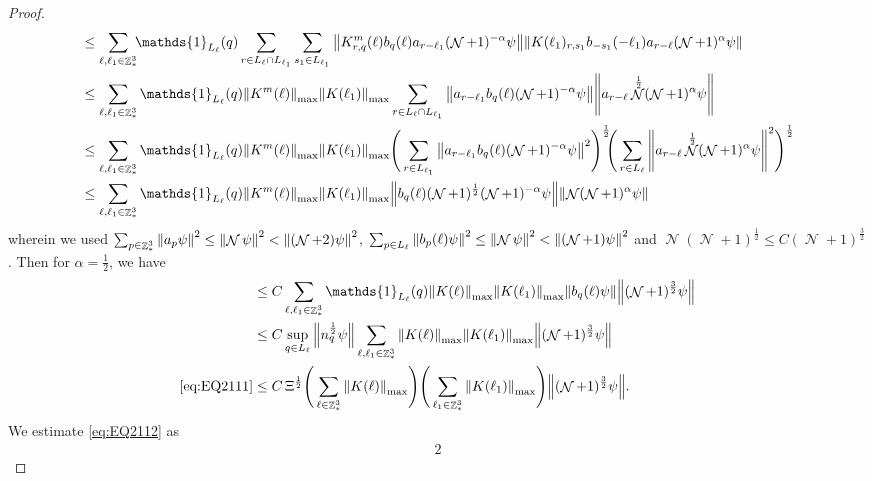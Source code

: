\documentclass[sn-mathphys, Numbered ,a4paper]{sn-jnl}%
\DeclareMathOperator{\Z}{\mathbb{Z}}
\DeclareMathOperator{\NN}{\mathcal{N}}
\newcommand{\half}{\frac{1}{2}}
\theoremstyle{plain}
\theoremstyle{definition}
\theoremstyle{remark}
\theoremstyle{plain}
\theoremstyle{definition}
\theoremstyle{remark}
\begin{document}
\begin{proof}
\begin{align}
  	&\leq \sum\limits_{\ell,\ell_1 \in \Z^3_*} \!\!\mathds{1}_{L_\ell}(q) \sum\limits_{r \in L_\ell \cap L_{\ell_1}}  \sum\limits_{s_1 \in L_{\ell_1}} \norm{ K^{m}_{r,q}(\ell) b_{q}(\ell) a_{r-\ell_1} (\NN+1)^{-\alpha}\psi}\norm{K(\ell_1)_{r,s_1} b_{-s_1}(-\ell_1)  a_{r-\ell} (\NN+1)^{\alpha}\psi } \nonumber\\
  	&\leq \sum\limits_{\ell,\ell_1 \in \Z^3_*} \mathds{1}_{L_\ell}(q) \norm{K^{m}(\ell)}_{\mathrm{max}}\norm{K(\ell_1)}_{\mathrm{max}} \sum\limits_{r \in L_\ell \cap L_{\ell_1}} \norm{ a_{r-\ell_1} b_{q}(\ell) (\NN+1)^{-\alpha} \psi} \norm { a_{r-\ell}\NN^\half (\NN+1)^{\alpha} \psi }\nonumber\\
  	&\leq \sum\limits_{\ell,\ell_1 \in \Z^3_*} \mathds{1}_{L_\ell}(q) \norm{K^{m}(\ell)}_{\mathrm{max}}\norm{K(\ell_1)}_{\mathrm{max}} \Bigg(\sum\limits_{r \in L_{\ell_1}} \norm{ a_{r-\ell_1}b_{q}(\ell) (\NN+1)^{-\alpha} \psi}^2\Bigg)^\half\!\!\Bigg( \sum\limits_{r \in L_\ell} \norm { a_{r-\ell} \NN^\half (\NN+1)^{\alpha} \psi }^2\Bigg)^\half\nonumber\\
  	&\leq \sum\limits_{\ell,\ell_1 \in \Z^3_*} \mathds{1}_{L_\ell}(q) \norm{K^{m}(\ell)}_{\mathrm{max}}\norm{K(\ell_1)}_{\mathrm{max}}  \norm{ b_{q}(\ell) (\NN+1)^\half (\NN+1)^{-\alpha} \psi}  \norm { \NN (\NN+1)^{\alpha} \psi }\nonumber
  \end{align}
  wherein we used $\sum_{p\in \Z^3_*}\norm{a_p \psi}^2\leq\norm{\NN\psi}^2<\norm{(\NN+2)\psi}^2$, $\sum_{p\in L_{\ell}}\norm{b_p({\ell}) \psi}^2\leq\norm{\NN\psi}^2<\norm{(\NN+1)\psi}^2$ and $\NN(\NN+1)^\half\leq C(\NN+1)^{\frac{3}{2}}$. Then for $\alpha = \half $, we have
  \begin{align}
  	&\leq C\sum\limits_{\ell,\ell_1 \in \Z^3_*} \mathds{1}_{L_\ell}(q) \norm{K(\ell)}_{\mathrm{max}}\norm{K(\ell_1)}_{\mathrm{max}}  \norm{b_{q}(\ell) \psi} \norm { (\NN+1)^{\frac{3}{2}} \psi } \nonumber\\
  	&\leq C \sup\limits_{q \in L_\ell} \norm{n_{q}^{\half} \psi} \sum\limits_{\ell,\ell_1 \in \Z^3_*} \norm{K(\ell)}_{\mathrm{max}} \norm{K(\ell_1)}_{\mathrm{max}} \norm { (\NN+1)^{\frac{3}{2}} \psi} \nonumber\\
  	\eqref{eq:EQ2111}&\leq C\, \Xi^\half \Bigg(\sum\limits_{\ell \in \Z^3_*} \norm{K(\ell)}_{\mathrm{max}}\Bigg)\Bigg( \sum\limits_{\ell_1 \in \Z^3_*}\norm{K(\ell_1)}_{\mathrm{max}} \Bigg)  \norm { (\NN+1)^{\frac{3}{2}} \psi }. \label{eq:estEQ2111}    
  \end{align}
  We estimate \eqref{eq:EQ2112} as 
  \begin{alignat}{2}

\end{alignat}
\end{proof}
\end{document}

